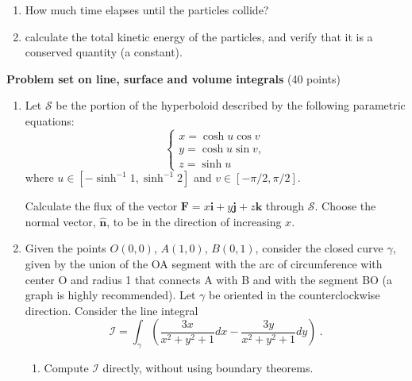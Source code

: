 \documentclass[fleqn]{article}
\begin{document}
\begin{enumerate}
\begin{enumerate}
        \item How much time elapses until the particles collide?  
    
        \item calculate the total kinetic energy of the particles, and verify that it is a conserved quantity (a constant).  
        \end{enumerate}
    
  \end{enumerate}

  \pagebreak

  \textbf{Problem set on line, surface and volume integrals} (40 points)
  \begin{enumerate}

    \item Let ${\mathcal S}$ be the portion of the hyperboloid 
    described by the following parametric equations:
    \begin{equation} 
      \begin{cases} 
      x = \cosh u \cos v  \nonumber \\
      y = \cosh u \sin v,  \nonumber \\
      z = \sinh u  \nonumber 
      \end{cases}
    \end{equation} 
    where $u \in \left[-\sinh^{-1} 1, \sinh^{-1} 2 \right]$ and $v \in \left[-\pi/2, \pi/2 \right]$. 
    
    Calculate the flux of the vector $\mathbf{F} = x\mathbf{i }+ y\mathbf{j }+ z\mathbf{k}$ through ${\mathcal S}$. Choose the normal vector, $\mathbf{\hat{n}}$, to be in the direction of increasing $x$.
    
    \item Given the points $O (0, 0)$, $A (1, 0)$, $B (0, 1)$, consider the closed curve $\gamma$, given by the union of the OA segment
    with the arc of circumference with center O and radius 1 that connects A with B and with the segment BO (a graph is highly recommended). Let $\gamma$ be oriented in the 
    counterclockwise direction. Consider the line integral
    $${\mathcal I} = \int_{\gamma} \left(\frac{3x}{x^2 + y^2 +1} dx-\frac{3y}{x^2 + y^2 +1} dy
       \right)~.
       $$
      \begin{enumerate}
        \item Compute  ${\mathcal I}$ directly, without using boundary theorems. 
        

\end{enumerate}
\end{enumerate}
\end{document}
